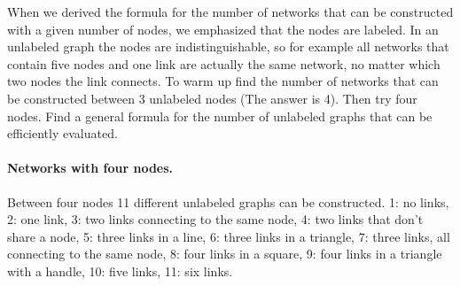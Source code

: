 



When we derived the formula for the number of networks that can be constructed with a given number of nodes, we emphasized that the nodes are labeled. In an unlabeled graph the nodes are indistinguishable, so for example all networks that contain five nodes and  one link are actually the same network, no matter which two nodes the link connects. To warm up find the number of networks that can be constructed between 3 unlabeled nodes (The answer is 4). Then try four nodes. Find a general formula for the number of unlabeled graphs that can be efficiently evaluated.


\solution
\paragraph{Networks with four nodes.} Between four nodes 11 different unlabeled graphs can be constructed. 1: no links, 2: one link, 3: two links connecting to the same node, 4: two links that don't share a node, 5: three links in a line, 6: three links in a triangle, 7: three links, all connecting to the same node, 8: four links in a square, 9: four links in a triangle with a handle, 10: five links, 11: six links.

